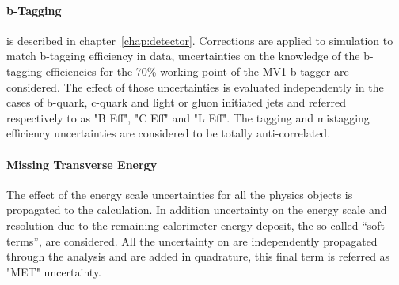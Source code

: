 \paragraph{b-Tagging} is described in chapter~\ref{chap:detector}. Corrections are applied to simulation
to match b-tagging efficiency in data, uncertainties on the knowledge 
of the b-tagging efficiencies for the 70\% working point of the MV1 b-tagger are
considered. The effect of those uncertainties is evaluated independently in the cases of
 b-quark, c-quark and light or gluon initiated jets and referred respectively 
to as "B  Eff", "C Eff" and "L Eff". The tagging and mistagging efficiency uncertainties 
 are considered to be totally anti-correlated. 

\paragraph{Missing Transverse Energy}
The effect of the energy scale
uncertainties for all the physics objects is propagated to the \met calculation.
In addition uncertainty on the energy scale and resolution due to the remaining 
calorimeter energy deposit, the so called ``soft-terms'', are considered. All the
uncertainty on \met are independently propagated through the analysis and are
added in quadrature, this final term is referred as "MET" uncertainty.


	
